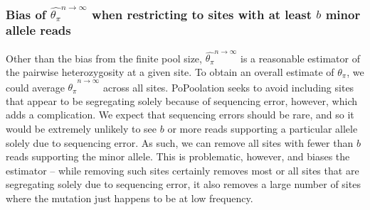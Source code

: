 \documentclass[a4paper,fontsize=9pt,DIV=14]{scrartcl}
\newcounter{todo}
\newcounter{popoolissue}
\newcommand\todo[1]{}
\newcommand\popoolissue[1]{}
\newcommand{\samplesize}{n}
\newcommand{\thetapi}{\widehat{\theta_\pi}}
\begin{document}
\popoolissue{We think that it is makes sense to compute only on biallelic SNPs, as this is a theoretical derivation of $4N_e\mu$, which assumes the infinitesimal model (which does not allow for multi-allelic loci). Still, we briefly wanted to check in with you here. Our guess is that the computation in code is just done for all four nucleotides to keep the code simple -- but the function only gets called for biallelic sites, so it behaves as if it was only computed for biallelic SNPs. Is that right?}



\subsubsection*{Bias of $\thetapi^{\samplesize\to\infty}$ when restricting to sites with at least $b$ minor allele reads}
\label{supp:sec:ThetaPi:sub:PoolSequencing:sub:ExpectedValue}

Other than the bias from the finite pool size, $\thetapi^{\samplesize\to\infty}$ is a reasonable estimator of the pairwise heterozygosity at a given site.  To obtain an overall estimate of $\theta_\pi$, we could average $\thetapi^{\samplesize\to\infty}$ across all sites.  PoPoolation seeks to avoid including sites that appear to be segregating solely because of sequencing error, however, which adds a complication.  We expect that sequencing errors should be rare, and so it would be extremely unlikely to see $b$ or more reads supporting a particular allele solely due to sequencing error.  As such, we can remove all sites with fewer than $b$ reads supporting the minor allele.  This is problematic, however, and biases the estimator -- while removing such sites certainly removes most or all sites that are segregating solely due to sequencing error, it also removes a large number of sites where the mutation just happens to be at low frequency.
\end{document}
